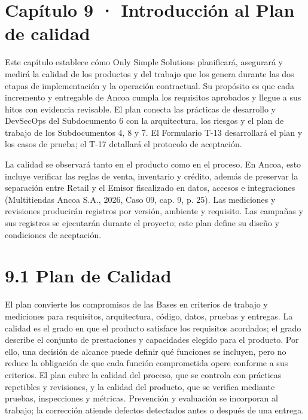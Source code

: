 \documentclass[11pt]{article}
\begin{document}
\tableofcontents
\clearpage

\renewcommand{\thefigure}{9.\arabic{figure}}

\section{Capítulo 9 · Introducción al Plan de calidad}

Este capítulo establece cómo Only Simple Solutions planificará, asegurará y medirá la calidad de los productos y del trabajo que los genera durante las dos etapas de implementación y la operación contractual. Su propósito es que cada incremento y entregable de Ancoa cumpla los requisitos aprobados y llegue a sus hitos con evidencia revisable. El plan conecta las prácticas de desarrollo y DevSecOps del Subdocumento 6 con la arquitectura, los riesgos y el plan de trabajo de los Subdocumentos 4, 8 y 7. El Formulario T-13 desarrollará el plan y los casos de prueba; el T-17 detallará el protocolo de aceptación.

La calidad se observará tanto en el producto como en el proceso. En Ancoa, esto incluye verificar las reglas de venta, inventario y crédito, además de preservar la separación entre Retail y el Emisor fiscalizado en datos, accesos e integraciones (Multitiendas Ancoa S.A., 2026, Caso 09, cap. 9, p. 25). Las mediciones y revisiones producirán registros por versión, ambiente y requisito. Las campañas y sus registros se ejecutarán durante el proyecto; este plan define su diseño y condiciones de aceptación.

\section{9.1 Plan de Calidad}

El plan convierte los compromisos de las Bases en criterios de trabajo y mediciones para requisitos, arquitectura, código, datos, pruebas y entregas. La calidad es el grado en que el producto satisface los requisitos acordados; el grado describe el conjunto de prestaciones y capacidades elegido para el producto. Por ello, una decisión de alcance puede definir qué funciones se incluyen, pero no reduce la obligación de que cada función comprometida opere conforme a sus criterios. El plan cubre la calidad del proceso, que se controla con prácticas repetibles y revisiones, y la calidad del producto, que se verifica mediante pruebas, inspecciones y métricas. Prevención y evaluación se incorporan al trabajo; la corrección atiende defectos detectados antes o después de una entrega.
\end{document}
